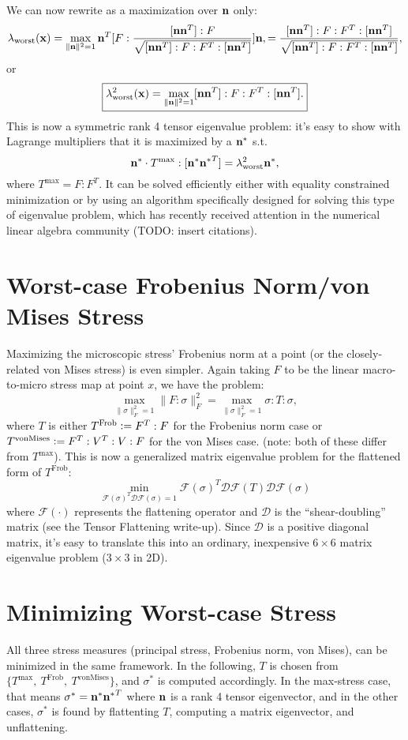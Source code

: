 \documentclass[10pt]{article}
\providecommand{\norm}[1]{\lVert#1\rVert}
\renewcommand{\vec}[1]{{\bf #1}}
\newcommand\pr[1]{\prettyref{#1}}
\def\n{{\bf n}}
\def\x{\vec{x}}
\def\flat{\mathscr{F}}
\newcommand{\defeq}{\vcentcolon=}
\begin{document}
We can now rewrite \pr{eqn:worstEigenvalueForm} as a maximization over $\n$
only:
$$
\lambda_\text{worst}(\x) = \max_{\norm{\n}^2 = 1} \n^T [F : \frac{[\n \n^T] : F}{\sqrt{[\n {\n}^T] : F : F^T : [\n {\n}^T]}}] \n,
                         = \frac{[\n {\n}^T] : F : F^T : [\n {\n}^T]}{\sqrt{[\n {\n}^T] : F : F^T : [\n {\n}^T]}},
$$
or
$$
\boxed{
\lambda_\text{worst}^2(\x) = \max_{\norm{\n}^2 = 1} [\n {\n}^T] : F : F^T : [\n {\n}^T].
}
$$
This is now a symmetric rank 4 tensor eigenvalue problem: it's easy to show with Lagrange multipliers that it is maximized by a $\n^*$ s.t.
$$
\n^* \cdot T^\text{max} : [\n^* {\n^*}^T] = \lambda_\text{worst}^2 \n^*,
$$
where $T^\text{max} = F : F^T$.
It can be solved efficiently either with equality constrained minimization or by
using an algorithm specifically designed for solving this type of eigenvalue
problem, which has recently received attention in the numerical linear algebra
community (TODO: insert citations).

\section{Worst-case Frobenius Norm/von Mises Stress}
Maximizing the microscopic stress' Frobenius norm at a point (or the
closely-related von Mises stress) is even simpler. Again taking $F$ to be the
linear macro-to-micro stress map at point $x$, we have the problem:
$$
\max_{\norm{\sigma}_F^2 = 1} \norm{F : \sigma}_F^2 = 
\max_{\norm{\sigma}_F^2 = 1} \sigma : T : \sigma,
$$
where $T$ is either $T^\text{Frob} \defeq F^T : F$ for the Frobenius norm case
or $T^\text{vonMises} \defeq F^T : V^T : V : F$ for the von Mises case. (note:
both of these differ from $T^\text{max}$).
This is now a generalized matrix eigenvalue problem for the flattened form of
$T^\text{Frob}$:
$$
\min_{\flat(\sigma)^T \mathcal{D} \flat(\sigma) = 1} \flat(\sigma)^T
\mathcal{D} \flat(T) \mathcal{D} \flat(\sigma)
$$
where $\flat(\cdot)$ represents the flattening operator and $\mathcal{D}$ is
the ``shear-doubling'' matrix (see the Tensor Flattening write-up). Since
$\mathcal{D}$ is a positive diagonal matrix, it's easy to translate this into
an ordinary, inexpensive $6 \times 6$ matrix eigenvalue problem ($3 \times 3$
in 2D).

\section{Minimizing Worst-case Stress}
All three stress measures (principal stress, Frobenius norm, von Mises), can be
minimized in the same framework. In the following, $T$ is chosen from $\{
    T^\text{max},\ T^\text{Frob},\ T^\text{vonMises}\}$, and $\sigma^*$ is
computed accordingly. In the max-stress case, that means $\sigma^* = \n^* { \n^*
}^T$ where $\n$ is a rank 4 tensor eigenvector, and in the other cases, $\sigma^*$
is found by flattenting $T$, computing a matrix eigenvector, and unflattening.
\end{document}

